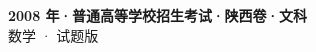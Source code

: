 \documentclass[zihao=-4, a4paper]{ctexart}
\begin{document}
\begin{center}
  {\Large\bfseries 2008 年·普通高等学校招生考试·陕西卷·文科}\\[4pt]
  {\large 数学 · 试题版}
\end{center}
\medskip
{}

\end{document}

